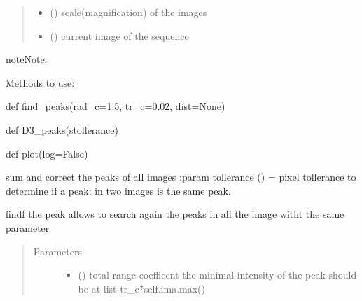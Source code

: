 \documentclass[letterpaper,10pt,english]{sphinxmanual}
\begin{document}
\begin{fulllineitems}
\begin{quote}
\begin{description}
\begin{itemize}
\item {} 
 () \textendash{} scale(magnification) of the images

\item {} 
 () \textendash{} current image of the sequence

\end{itemize}

\end{description}\end{quote}

\begin{sphinxadmonition}{note}{Note:}
\begin{DUlineblock}{0em}
\item[] Methods to use:
\item[] def find\_peaks(rad\_c=1.5, tr\_c=0.02, dist=None)
\item[] def D3\_peaks(stollerance)
\item[] def plot(log=False)
\end{DUlineblock}
\end{sphinxadmonition}

\begin{fulllineitems}
\label{\detokenize{index:TEMpcPlot.SeqIm.D3_peaks}}
sum and correct the peaks of all images
:param tollerance () = pixel tollerance to determine if a peak: in two images is the same peak.

\end{fulllineitems}


\begin{fulllineitems}
\label{\detokenize{index:TEMpcPlot.SeqIm.find_peaks}}
findf the peak
allows to search again the peaks in all the image witht the same
parameter
\begin{quote}\begin{description}
\item[{Parameters}] \leavevmode\begin{itemize}
\item {} 
 () \textendash{} total range coefficent the minimal intensity of the peak should be at list tr\_c*self.ima.max()


\end{itemize}
\end{description}
\end{quote}
\end{fulllineitems}
\end{fulllineitems}
\end{document}
